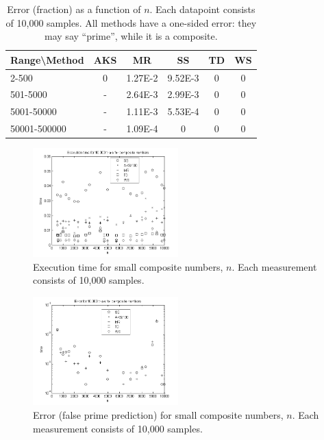 \begin{table}
\centering
\caption{Error (fraction) as a function of $n$. Each datapoint consists of 10,000 samples. All methods have a one-sided error: they may say ``prime'', while it is a composite.}
\begin{tabular}{|l|c|c|c|c|c|} \hline
Range\textbackslash Method&AKS&MR&SS&TD&WS \\ \hline
2-500&0&1.27E-2&9.52E-3&0&0 \\ \hline
501-5000&-&2.64E-3&2.99E-3&0&0 \\ \hline
5001-50000&-&1.11E-3&5.53E-4&0&0 \\ \hline
50001-500000&-&1.09E-4&0&0&0 \\ \hline
\end{tabular}
\label{tab:pressure}
\end{table}



\begin{figure}
	\centering
	\includegraphics[width=0.5\textwidth]{../Graphs/ExecutionTime1.png}
	\caption{Execution time for small composite numbers, $n$. Each measurement consists of 10,000 samples.}
	\label{fig:executionTime1}
\end{figure}


\begin{figure}
	\centering
	\includegraphics[width=0.5\textwidth]{../Graphs/Error1.png}
	\caption{Error (false prime prediction) for small composite numbers, $n$. Each measurement consists of 10,000 samples.}
	\label{fig:error1}
\end{figure}


